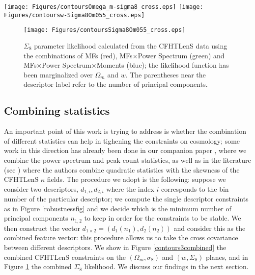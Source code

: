 \documentclass[reprint,aps,prd,superscriptaddress,showkeys,showpacs]{revtex4-1}
\begin{document}
\begin{figure*}
\begin{center}
\texttt{[image: Figures/contoursOmega\_m-sigma8\_cross.eps]}
\texttt{[image: Figures/contoursw-Sigma8Om055\_cross.eps]}
\end{center}
\caption{Combined $1\sigma$ constraints on the $(\Omega_m,\sigma_8)$ (left panel) and $(w,\Sigma_8)$ (right panel) doublets, using the MFs (red), MFs$\times$Power Spectrum (green) and MFs$\times$Power Spectrum$\times$Moments (blue). The likelihood function has been marginalized over $w$ (left panel) and $\Omega_m$ (right panel). The parentheses near the descriptor labels refer to the number of principal components.}
\label{contours3combined}
\end{figure*}

\begin{figure}
\begin{center}
\texttt{[image: Figures/contoursSigma8Om055\_cross.eps]}
\end{center}
\caption{$\Sigma_8$ parameter likelihood calculated from the CFHTLenS data using the combinations of MFs (red), MFs$\times$Power Spectrum (green) and MFs$\times$Power Spectrum$\times$Moments (blue); the likelihood function has been marginalized over $\Omega_m$ and $w$. The parentheses near the descriptor label refer to the number of principal components.}
\label{likelihoodSi8cross}
\end{figure}

\subsection{Combining statistics}
An important point of this work is trying to address is whether the combination of different statistics can help in tighening the constraints on cosmology; some work in this direction has already been done in our companion paper \citep{Companion}, where we combine the power spectrum and peak count statistics, as well as in the literature (see \citep{CFHTFu}) where the authors combine quadratic statistics with the skewness of the CFHTLenS $\kappa$ fields. The procedure we adopt is the following: suppose we consider two descriptors, $d_{1,i},d_{2,i}$ where the index $i$ corresponds to the bin number of the particular descriptor; we compute the single descriptor constraints as in Figure \ref{robustnessfig} and we decide which is the minimum number of principal components $n_{1,2}$ to keep in order for the constraints to be stable. We then construct the vector $d_{1\times2} = (d_1(n_1),d_2(n_2))$ and consider this as the combined feature vector: this procedure allows us to take the cross covariance between different descriptors. We show in Figure \ref{contours3combined} the combined CFHTLenS constraints on the $(\Omega_m,\sigma_8)$ and $(w,\Sigma_8)$ planes, and in Figure \ref{likelihoodSi8cross} the combined $\Sigma_8$ likelihood. We discuss our findings in the next section. 
\end{document}
